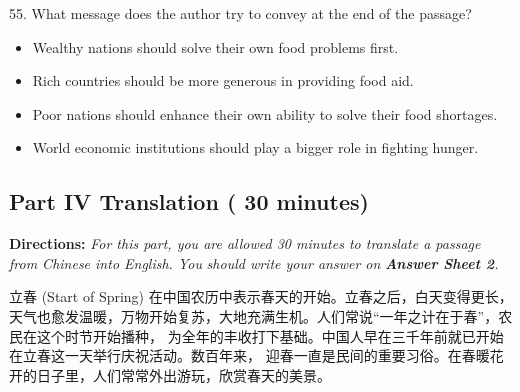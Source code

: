 \documentclass[UTF8,11pt]{ctexart}
\begin{document}
55. What message does the author try to convey at the end of the passage?


\begin{itemize}[leftmargin=2em,itemsep=.2em,topsep=.4em]\item[A.] Wealthy nations should solve their own food problems first.
\item[B.] Rich countries should be more generous in providing food aid.
\item[C.] Poor nations should enhance their own ability to solve their food shortages.
\item[D.] World economic institutions should play a bigger role in fighting hunger.
\end{itemize}

\subsection*{\textbf{Part IV Translation} \textbf{( 30 minutes)}}


\textbf{Directions: }\textit{For this part, you are allowed 30 minutes to translate a passage from Chinese into English. You} \textit{should write your answer on }\textbf{\textit{Answer Sheet 2}}\textit{.}


立春 (Start of Spring) 在中国农历中表示春天的开始。立春之后，白天变得更长，天气也愈发温暖，万物开始复苏，大地充满生机。人们常说“一年之计在于春”，农民在这个时节开始播种， 为全年的丰收打下基础。中国人早在三千年前就已开始在立春这一天举行庆祝活动。数百年来， 迎春一直是民间的重要习俗。在春暖花开的日子里，人们常常外出游玩，欣赏春天的美景。
\end{document}
